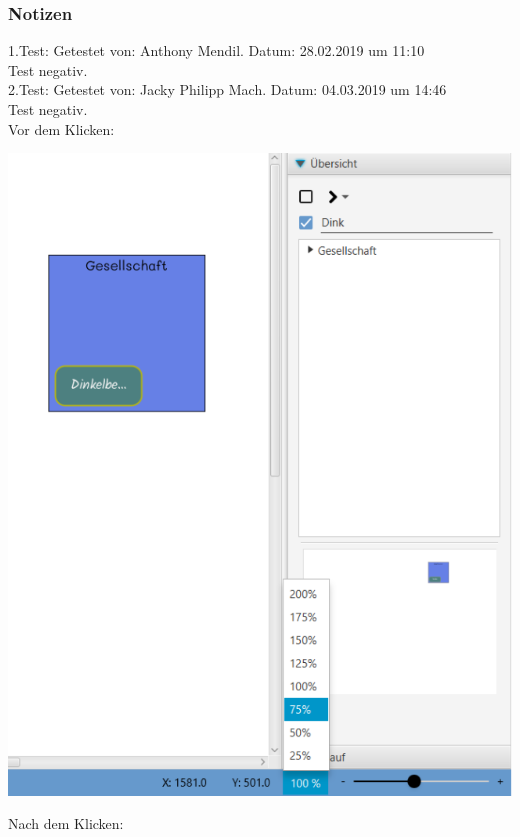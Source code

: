 \documentclass[enabledeprecatedfontcommands]{scrartcl}
\begin{document}
\subsubsection{Notizen}
1.Test: Getestet von: Anthony Mendil. Datum: 28.02.2019 um 11:10 \\
Test negativ.\\
2.Test: Getestet von: Jacky Philipp Mach. Datum: 04.03.2019 um 14:46 \\
Test negativ.\\
Vor dem Klicken:
\begin{center}
\includegraphics[height=17cm]{zoom75vorher.PNG}
\end{center}
Nach dem Klicken: 
\end{document}
